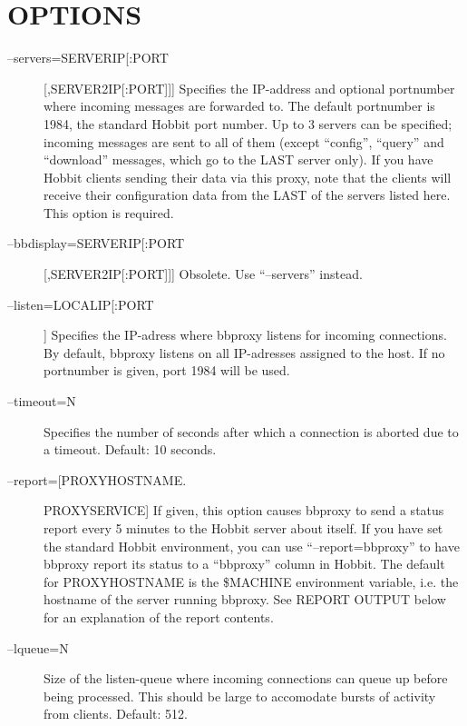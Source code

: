 
\section{OPTIONS}
\begin{description}
\item[--servers=SERVERIP[:PORT][,SERVER2IP[:PORT]]] Specifies the IP-address and optional portnumber where incoming messages are forwarded to. The default portnumber is 1984, the standard Hobbit port number. Up to 3 servers can be specified; incoming messages are sent to all of them (except ``config'', ``query'' and ``download'' messages, which go to the LAST server only). If you have Hobbit clients sending their data via this proxy, note that the clients will receive their configuration data from the LAST of the servers listed here. This option is required. 

 

\item[--bbdisplay=SERVERIP[:PORT][,SERVER2IP[:PORT]]] Obsolete. Use ``--servers'' instead. 

 

\item[--listen=LOCALIP[:PORT]] Specifies the IP-adress where bbproxy listens for incoming connections. By default, bbproxy listens on all IP-adresses assigned to the host. If no portnumber is given, port 1984 will be used. 

 

\item[--timeout=N] Specifies the number of seconds after which a connection is aborted due to a timeout. Default: 10 seconds. 

 

\item[--report=[PROXYHOSTNAME.]PROXYSERVICE] If given, this option causes bbproxy to send a status report every 5 minutes to the Hobbit server about itself. If you have set the standard Hobbit environment, you can use ``--report=bbproxy'' to have bbproxy report its status to a ``bbproxy'' column in Hobbit. The default for PROXYHOSTNAME is the \$MACHINE environment variable, i.e. the hostname of the server running bbproxy. See REPORT OUTPUT below for an explanation of the report contents. 

 

\item[--lqueue=N] Size of the listen-queue where incoming connections can queue up before being processed. This should be large to accomodate bursts of activity from clients. Default: 512. 


\end{description}
